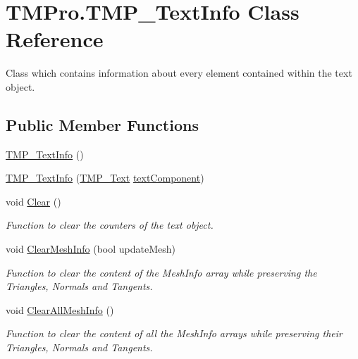 \hypertarget{class_t_m_pro_1_1_t_m_p___text_info}{}\section{T\+M\+Pro.\+T\+M\+P\+\_\+\+Text\+Info Class Reference}
\label{class_t_m_pro_1_1_t_m_p___text_info}


Class which contains information about every element contained within the text object.  


\subsection*{Public Member Functions}
\begin{DoxyCompactItemize}
\item 
\mbox{\hyperlink{class_t_m_pro_1_1_t_m_p___text_info_a3311c0c2844d83db91e01c3c2237cfb4}{T\+M\+P\+\_\+\+Text\+Info}} ()
\item 
\mbox{\hyperlink{class_t_m_pro_1_1_t_m_p___text_info_a73cb6b530a8da8d58248b4dcacc5ee7c}{T\+M\+P\+\_\+\+Text\+Info}} (\mbox{\hyperlink{class_t_m_pro_1_1_t_m_p___text}{T\+M\+P\+\_\+\+Text}} \mbox{\hyperlink{class_t_m_pro_1_1_t_m_p___text_info_ab23d67636c516cc8bd985f7e0904d3d9}{text\+Component}})
\item 
void \mbox{\hyperlink{class_t_m_pro_1_1_t_m_p___text_info_a15b8c8e9f46c5412276e45c6f675edf2}{Clear}} ()
\begin{DoxyCompactList}\small\item\em Function to clear the counters of the text object. \end{DoxyCompactList}\item 
void \mbox{\hyperlink{class_t_m_pro_1_1_t_m_p___text_info_aa34f6fe698de702b8a775b4e57d91ed4}{Clear\+Mesh\+Info}} (bool update\+Mesh)
\begin{DoxyCompactList}\small\item\em Function to clear the content of the Mesh\+Info array while preserving the Triangles, Normals and Tangents. \end{DoxyCompactList}\item 
void \mbox{\hyperlink{class_t_m_pro_1_1_t_m_p___text_info_aaf8e50d7075ed34cd7668d5df8225194}{Clear\+All\+Mesh\+Info}} ()
\begin{DoxyCompactList}\small\item\em Function to clear the content of all the Mesh\+Info arrays while preserving their Triangles, Normals and Tangents. \end{DoxyCompactList}\item 

\end{DoxyCompactItemize}
